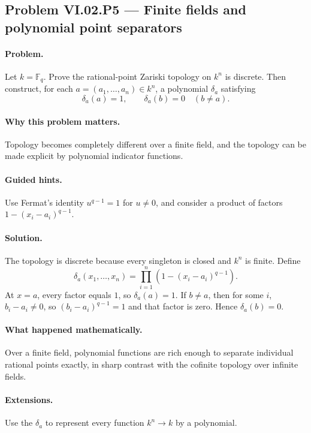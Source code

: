 \subsection*{Problem VI.02.P5 --- Finite fields and polynomial point separators}
\label{prob:vi02-p5}

\paragraph{Problem.}
Let \(k=\mathbb F_q\).  Prove the rational-point Zariski topology on \(k^n\) is discrete.
Then construct, for each \(a=(a_1,\dots,a_n)\in k^n\), a polynomial \(\delta_a\) satisfying
\[
\delta_a(a)=1,
\qquad
\delta_a(b)=0\quad(b\neq a).
\]

\ifdefined\FullProblemDossiers
\paragraph{Why this problem matters.}
Topology becomes completely different over a finite field, and the topology can be made
explicit by polynomial indicator functions.

\paragraph{Guided hints.}
Use Fermat's identity \(u^{q-1}=1\) for \(u\neq0\), and consider a product of factors
\(1-(x_i-a_i)^{q-1}\).

\paragraph{Solution.}
The topology is discrete because every singleton is closed and \(k^n\) is finite.  Define
\[
\delta_a(x_1,\dots,x_n)
=\prod_{i=1}^n\left(1-(x_i-a_i)^{q-1}\right).
\]
At \(x=a\), every factor equals \(1\), so \(\delta_a(a)=1\).  If \(b\neq a\), then for
some \(i\), \(b_i-a_i\neq0\), so \((b_i-a_i)^{q-1}=1\) and that factor is zero.  Hence
\(\delta_a(b)=0\).

\paragraph{What happened mathematically.}
Over a finite field, polynomial functions are rich enough to separate individual rational
points exactly, in sharp contrast with the cofinite topology over infinite fields.

\paragraph{Extensions.}
Use the \(\delta_a\) to represent every function \(k^n\to k\) by a polynomial.
\fi
